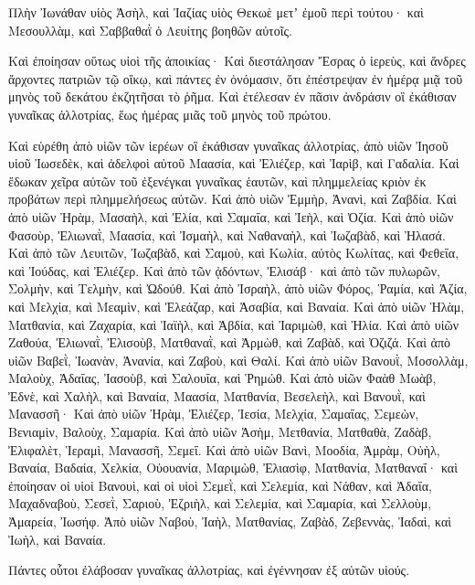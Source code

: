 {Πλὴν Ἰωνάθαν υἱὸς Ἀσὴλ, καὶ Ἰαζίας υἱὸς Θεκωὲ μετʼ ἐμοῦ περὶ τούτου· καὶ Μεσουλλὰμ, καὶ Σαββαθαῒ ὁ Λευίτης βοηθῶν αὐτοῖς.
\par }{\PP {}Καὶ ἐποίησαν οὕτως υἱοὶ τῆς ἀποικίας· Καὶ διεστάλησαν Ἔσρας ὁ ἱερεὺς, καὶ ἄνδρες ἄρχοντες πατριῶν τῷ οἴκῳ, καὶ πάντες ἐν ὀνόμασιν, ὅτι ἐπέστρεψαν ἐν ἡμέρᾳ μιᾷ τοῦ μηνὸς τοῦ δεκάτου ἐκζητῆσαι τὸ ῥῆμα.
Καὶ ἐτέλεσαν ἐν πᾶσιν ἀνδράσιν οἳ ἐκάθισαν γυναῖκας ἀλλοτρίας, ἕως ἡμέρας μιᾶς τοῦ μηνὸς τοῦ πρώτου.
\par }{\PP {}Καὶ εὑρέθη ἀπὸ υἱῶν τῶν ἱερέων οἳ ἐκάθισαν γυναῖκας ἀλλοτρίας, ἀπὸ υἱῶν Ἰησοῦ υἱοῦ Ἰωσεδὲκ, καὶ ἀδελφοὶ αὐτοῦ Μαασία, καὶ Ἐλιέζερ, καὶ Ἰαρὶβ, καὶ Γαδαλία.
Καὶ ἔδωκαν χεῖρα αὐτῶν τοῦ ἐξενέγκαι γυναῖκας ἑαυτῶν, καὶ πλημμελείας κριὸν ἐκ προβάτων περὶ πλημμελήσεως αὐτῶν.
Καὶ ἀπὸ υἱῶν Ἐμμὴρ, Ἀνανὶ, καὶ Ζαβδία.
Καὶ ἀπὸ υἱῶν Ἠρὰμ, Μασαὴλ, καὶ Ἐλία, καὶ Σαμαΐα, καὶ Ἰεὴλ, καὶ Ὀζία.
Καὶ ἀπὸ υἱῶν Φασοὺρ, Ἐλιωναῒ, Μαασία, καὶ Ἰσμαὴλ, καὶ Ναθαναὴλ, καὶ Ἰωζαβὰδ, καὶ Ἠλασά.
Καὶ ἀπὸ τῶν Λευιτῶν, Ἰωζαβὰδ, καὶ Σαμοὺ, καὶ Κωλία, αὐτὸς Κωλίτας, καὶ Φεθεΐα, καὶ Ἰούδας, καὶ Ἐλιέζερ.
Καὶ ἀπὸ τῶν ᾀδόντων, Ἐλισάβ· καὶ ἀπὸ τῶν πυλωρῶν, Σολμὴν, καὶ Τελμὴν, καὶ Ὠδούθ.
Καὶ ἀπὸ Ἰσραὴλ, ἀπὸ υἱῶν Φόρος, Ῥαμία, καὶ Ἀζία, καὶ Μελχία, καὶ Μεαμὶν, καὶ Ἐλεάζαρ, καὶ Ἀσαβία, καὶ Βαναία.
Καὶ ἀπὸ υἱῶν Ἡλὰμ, Ματθανία, καὶ Ζαχαρία, καὶ Ἰαϊὴλ, καὶ Ἀβδία, καὶ Ἰαριμὼθ, καὶ Ἠλία.
Καὶ ἀπὸ υἱῶν Ζαθούα, Ἐλιωναῒ, Ἐλισοὺβ, Ματθαναῒ, καὶ Ἀρμὼθ, καὶ Ζαβὰδ, καὶ Ὀζιζά.
Καὶ ἀπὸ υἱῶν Βαβεῒ, Ἰωανὰν, Ἀνανία, καὶ Ζαβοὺ, καὶ Θαλί.
Καὶ ἀπὸ υἱῶν Βανουῒ, Μοσολλὰμ, Μαλοὺχ, Ἀδαΐας, Ἰασοὺβ, καὶ Σαλουΐα, καὶ Ῥημώθ.
Καὶ ἀπὸ υἱῶν Φαὰθ Μωὰβ, Ἐδνὲ, καὶ Χαλὴλ, καὶ Βαναία, Μαασία, Ματθανία, Βεσελεὴλ, καὶ Βανουῒ, καὶ Μανασσῆ·
Καὶ ἀπὸ υἱῶν Ἠρὰμ, Ἐλιέζερ, Ἰεσία, Μελχία, Σαμαΐας, Σεμεὼν,
Βενιαμὶν, Βαλοὺχ, Σαμαρία.
Καὶ ἀπὸ υἱῶν Ἀσὴμ, Μετθανία, Ματθαθὰ, Ζαδὰβ, Ἐλιφαλὲτ, Ἱεραμὶ, Μανασσῆ, Σεμεΐ.
Καὶ ἀπὸ υἱῶν Βανὶ, Μοοδία, Ἀμρὰμ, Οὐὴλ,
Βαναία, Βαδαία, Χελκία,
Οὐουανία, Μαριμὼθ, Ἐλιασὶφ,
Ματθανία, Ματθαναΐ· καὶ ἐποίησαν
οἱ υἱοἱ Βανουὶ, καὶ οἱ υἱοὶ Σεμεῒ,
καὶ Σελεμία, καὶ Νάθαν, καὶ Ἀδαΐα,
Μαχαδναβοὺ, Σεσεῒ, Σαριοὺ,
Ἐζριὴλ, καὶ Σελεμία, καὶ Σαμαρία,
καὶ Σελλοὺμ, Ἀμαρεία, Ἰωσήφ.
Ἀπὸ υἱῶν Ναβοὺ, Ἰαὴλ, Ματθανίας, Ζαβὰδ, Ζεβεννὰς, Ἰαδαὶ, καὶ Ἰωὴλ, καὶ Βαναία.
\par }{\PP {}Πάντες οὗτοι ἐλάβοσαν γυναῖκας ἀλλοτρίας, καὶ ἐγέννησαν ἐξ αὐτῶν υἱούς.

}
